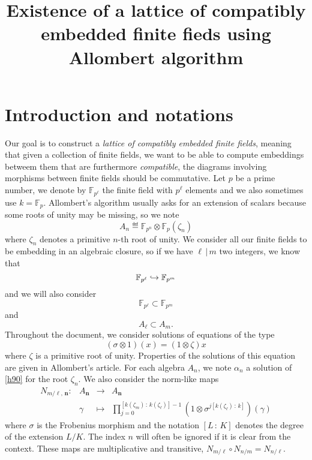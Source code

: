 \documentclass[a4paper,11pt]{article}
\title{Existence of a lattice of compatibly embedded finite fieds using
Allombert algorithm}
\author{}
\begin{document}
\maketitle





\section{Introduction and notations}

Our goal is to construct a \emph{lattice of compatibly embedded finite fields},
meaning that given a collection of finite fields, we want to be able to compute
embeddings betweem them that are furthermore \emph{compatible}, \ie the diagrams
involving morphisms between finite fields should be commutative. Let $p$ be a
prime number, we denote by $\mathbb{F}_{p^{\ell}}$ the finite field with
$p^\ell$ elements and we also sometimes use $k=\mathbb{F}_p$. Allombert's algorithm usually asks for an extension of
scalars because some roots of unity may be missing, so we note 
\[
  A_n \eqdef \mathbb{F}_{p^n}\otimes\mathbb{F}_{p}(\zeta_n)
\]
where $\zeta_n$ denotes a primitive $n$-th root of unity. We consider all our finite
fields to be embedding in an algebraic closure, so if we have $\ell\,|\,m$ two
integers, we know that
\[
  \mathbb{F}_{p^{\ell}}\hookrightarrow\mathbb{F}_{p^m}
\]
and we will also consider 
\[
  \mathbb{F}_{p^{\ell}}\subset\mathbb{F}_{p^m}
\]
and
\[
  A_{\ell}\subset A_m.
\]
Throughout the document, we consider solutions of equations of the type
\begin{equation}
  \tag{H90}
 (\sigma\otimes1)(x) = (1\otimes\zeta)x
  \label{h90}
\end{equation}
where $\zeta$ is a primitive root of unity. Properties of the solutions of this
equation are given in Allombert's article. For each algebra $A_n$, we note
$\alpha_n$ a solution of \eqref{h90} for the root $\zeta_n$. We also consider
the norm-like maps
\[
\begin{array}{cccc}
  N_{m/\ell,\, \bm{n}}: & A_{\bm{n}} & \to &
  A_{\bm{n}} \\
  & \gamma & \mapsto & \prod_{j=0}^{\left[ k(\zeta_m)\,:\,k(\zeta_\ell) \right]-1} (1 \otimes
  \sigma^{j\left[ k(\zeta_\ell)\,:\,k \right]})(\gamma)
\end{array}
\]
where $\sigma$ is the Frobenius morphism and the notation $\left[ L\,:\,K
\right]$ denotes the degree of the extension $L/K$. The index $n$ will often be
ignored if it is clear from the context. These maps are multiplicative and
transitive, \ie $N_{m/\ell}\circ N_{n/m} = N_{n/\ell}$.
\end{document}
